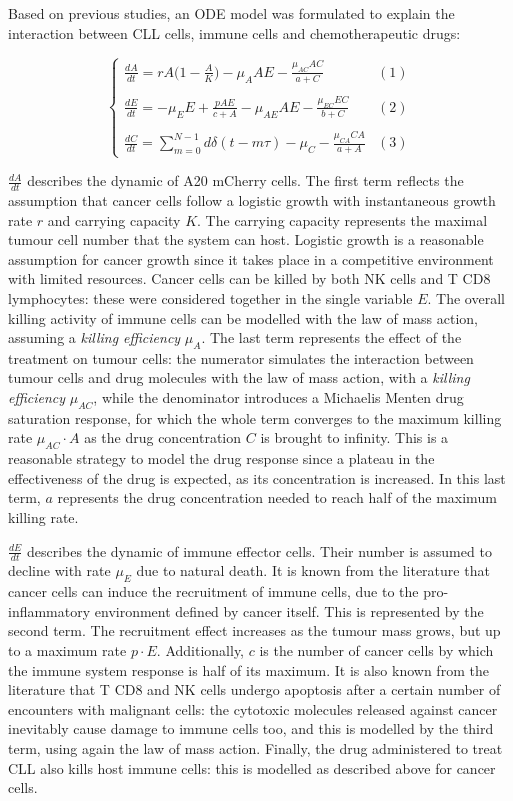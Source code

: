 Based on previous studies, an ODE model was formulated to explain the interaction between CLL cells, immune cells and chemotherapeutic drugs:

\[
\begin{cases} 
	\frac{dA}{dt} = rA \bigl( 1 - \frac{A}{K} \bigr) - \mu_A AE - \frac{\mu_{AC} AC}{a+C} & (1)\\ \\
	\frac{dE}{dt} = -\mu_E E + \frac{pAE}{c+A} - \mu_{AE} AE - \frac{\mu_{EC} EC}{b+C} & (2) \\ \\
	\frac{dC}{dt} = \sum_{m=0}^{N-1} d\delta (t-m\tau) - \mu_{C} - \frac{\mu_{CA} CA}{a+A} & (3) 
\end{cases}
\]

$\frac{dA}{dt}$ describes the dynamic of A20 mCherry cells. The first term reflects the assumption that cancer cells follow a logistic growth with instantaneous growth rate $r$ and carrying capacity $K$. The carrying capacity represents the maximal tumour cell number that the system can host. Logistic growth is a reasonable assumption for cancer growth since it takes place in a competitive environment with limited resources. Cancer cells can be killed by both NK cells and T CD8 lymphocytes: these were considered together in the single variable $E$. The overall killing activity of immune cells can be modelled with the law of mass action, assuming a \textit{killing efficiency} $\mu_{A}$. The last term represents the effect of the treatment on tumour cells: the numerator simulates the interaction between tumour cells and drug molecules with the law of mass action, with a \textit{killing efficiency} $\mu_{AC}$, while the denominator introduces a Michaelis Menten drug saturation response, for which the whole term converges to the maximum killing rate $\mu_{AC} \cdot A$ as the drug concentration $C$ is brought to infinity. This is a reasonable strategy to model the drug response since a plateau in the effectiveness of the drug is expected, as its concentration is increased. In this last term, $a$ represents the drug concentration needed to reach half of the maximum killing rate. \par
\vspace{0.4cm}
$\frac{dE}{dt}$ describes the dynamic of immune effector cells. Their number is assumed to decline with rate $\mu_{E}$ due to natural death. It is known from the literature that cancer cells can induce the recruitment of immune cells, due to the pro-inflammatory environment defined by cancer itself. This is represented by the second term. The recruitment effect increases as the tumour mass grows, but up to a maximum rate $p \cdot E$. Additionally, $c$ is the number of cancer cells by which the immune system response is half of its maximum. It is also known from the literature that T CD8 and NK cells undergo apoptosis after a certain number of encounters with malignant cells: the cytotoxic molecules released against cancer inevitably cause damage to immune cells too, and this is modelled by the third term, using again the law of mass action. Finally, the drug administered to treat CLL also kills host immune cells: this is modelled as described above for cancer cells. \par
